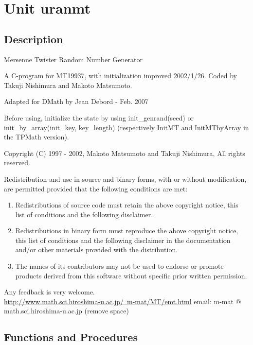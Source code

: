 \documentclass[12pt,a4paper,oneside]{report}
\begin{document}
\section{Unit uranmt}
\label{uranmt}
\subsection{Description}
Mersenne Twister Random Number Generator 

A C{-}program for MT19937, with initialization improved 2002/1/26. Coded by Takuji Nishimura and Makoto Matsumoto.

Adapted for DMath by Jean Debord {-} Feb. 2007

Before using, initialize the state by using init{\_}genrand(seed) or init{\_}by{\_}array(\allowbreak init{\_}key, key{\_}length) (respectively InitMT and InitMTbyArray in the TPMath version).

Copyright (C) 1997 {-} 2002, Makoto Matsumoto and Takuji Nishimura, All rights reserved.

Redistribution and use in source and binary forms, with or without modification, are permitted provided that the following conditions are met:
\begin{enumerate}
	\item Redistributions of source code must retain the above copyright notice, this list of conditions and the following disclaimer.
	
	\item Redistributions in binary form must reproduce the above copyright notice, this list of conditions and the following disclaimer in the documentation and/or other materials provided with the distribution.
	
	\item The names of its contributors may not be used to endorse or promote products derived from this software without specific prior written permission.
\end{enumerate}

Any feedback is very welcome.\\ \href{http://www.math.sci.hiroshima-u.ac.jp/~m-mat/MT/emt.html}{http://www.math.sci.hiroshima-u.ac.jp/~m-mat/MT/emt.html} email: m{-}mat @ math.sci.hiroshima{-}u.ac.jp (remove space) 
\subsection{Functions and Procedures}
\end{document}
